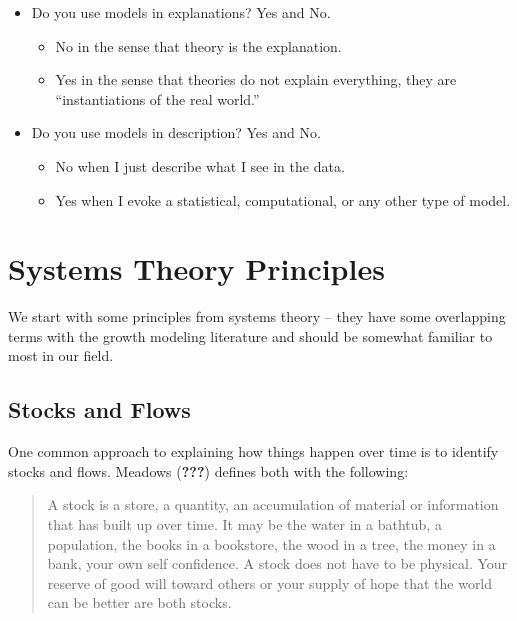\documentclass[english,,man]{apa6}
\providecommand{\tightlist}{%
  \setlength{\itemsep}{0pt}\setlength{\parskip}{0pt}}
\theoremstyle{definition}
\theoremstyle{definition}
\theoremstyle{definition}
\theoremstyle{remark}
\begin{document}
\begin{itemize}
\item
  Do you use models in explanations? Yes and No.

  \begin{itemize}
  \tightlist
  \item
    No in the sense that theory is the explanation.
  \item
    Yes in the sense that theories do not explain everything, they are
    \enquote{instantiations of the real world.}
  \end{itemize}
\item
  Do you use models in description? Yes and No.

  \begin{itemize}
  \tightlist
  \item
    No when I just describe what I see in the data.
  \item
    Yes when I evoke a statistical, computational, or any other type of
    model.
  \end{itemize}
\end{itemize}

\hypertarget{systems-theory-principles}{%
\section{Systems Theory Principles}\label{systems-theory-principles}}

We start with some principles from systems theory -- they have some
overlapping terms with the growth modeling literature and should be
somewhat familiar to most in our field.

\hypertarget{stocks-and-flows}{%
\subsection{Stocks and Flows}\label{stocks-and-flows}}

One common approach to explaining how things happen over time is to
identify stocks and flows. Meadows ({\textbf{???}}) defines both with
the following:

\begin{quote}
A stock is a store, a quantity, an accumulation of material or
information that has built up over time. It may be the water in a
bathtub, a population, the books in a bookstore, the wood in a tree, the
money in a bank, your own self confidence. A stock does not have to be
physical. Your reserve of good will toward others or your supply of hope
that the world can be better are both stocks.
\end{quote}
\end{document}
